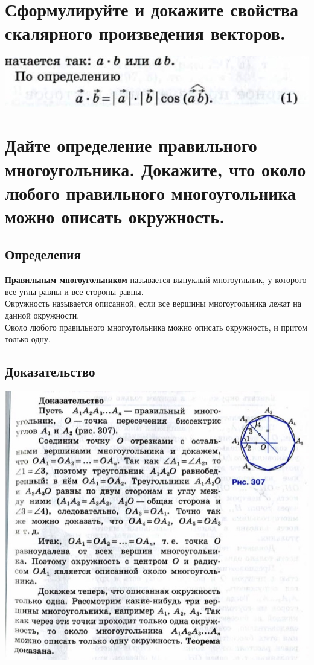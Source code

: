 \documentclass[12pt, letterpaper]{article}
\begin{document}
\section {Сформулируйте и докажите свойства скалярного произведения векторов.}
\includegraphics[scale=0.3]{photo.jpg} \\

\section {Дайте определение правильного многоугольника. Докажите, что около любого правильного многоугольника можно описать окружность.}
\subsection{Определения}
\textbf{Правильным многоугольником} называется выпуклый многоугльник, у которого все углы равны и все стороны равны. \\
Окружность называется описанной, если все вершины многоугольника лежат на данной окружности. \\
Около любого правильного многоугольника можно описать окружность, и притом только одну. \\
\subsection{Доказательство}
\includegraphics[scale=0.3]{photo4.jpg}
\end{document}

